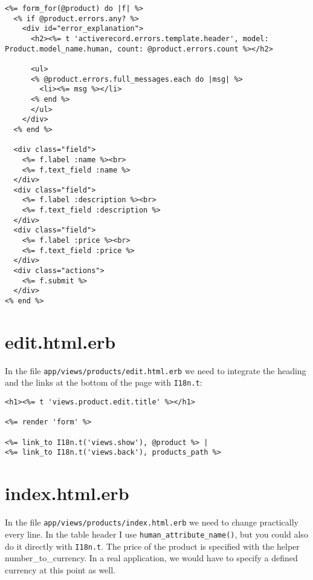 \documentclass[a4paper]{book}
\newcounter{tab}[chapter]
\begin{document}
\begin{shaded}\begin{verbatim}
<%= form_for(@product) do |f| %>
  <% if @product.errors.any? %>
    <div id="error_explanation">
      <h2><%= t 'activerecord.errors.template.header', model: Product.model_name.human, count: @product.errors.count %></h2>

      <ul>
      <% @product.errors.full_messages.each do |msg| %>
        <li><%= msg %></li>
      <% end %>
      </ul>
    </div>
  <% end %>

  <div class="field">
    <%= f.label :name %><br>
    <%= f.text_field :name %>
  </div>
  <div class="field">
    <%= f.label :description %><br>
    <%= f.text_field :description %>
  </div>
  <div class="field">
    <%= f.label :price %><br>
    <%= f.text_field :price %>
  </div>
  <div class="actions">
    <%= f.submit %>
  </div>
<% end %>
\end{verbatim}\end{shaded}

\section{edit.html.erb}\label{edit.html.erb}

In the file \texttt{app/views/products/edit.html.erb} we need to integrate the heading and the links at the bottom of the page with \texttt{I18n.t}:

\begin{shaded}\begin{verbatim}
<h1><%= t 'views.product.edit.title' %></h1>

<%= render 'form' %>

<%= link_to I18n.t('views.show'), @product %> |
<%= link_to I18n.t('views.back'), products_path %>
\end{verbatim}\end{shaded}

\section{index.html.erb}\label{index.html.erb}

In the file \texttt{app/views/products/index.html.erb} we need to change practically every line. In the table header I use \texttt{human\_attribute\_name()}, but you could also do it directly with \texttt{I18n.t}. The price of the product is specified with the helper number\_to\_currency. In a real application, we would have to specify a defined currency at this point as well.
\end{document}
